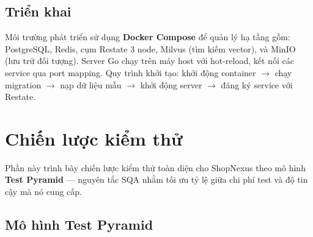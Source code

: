 \subsection{Triển khai}
\label{subsec:deployment}

Môi trường phát triển sử dụng \textbf{Docker Compose} để quản lý hạ tầng gồm: PostgreSQL, Redis, cụm Restate 3 node, Milvus (tìm kiếm vector), và MinIO (lưu trữ đối tượng). Server Go chạy trên máy host với hot-reload, kết nối các service qua port mapping. Quy trình khởi tạo: khởi động container $\rightarrow$ chạy migration $\rightarrow$ nạp dữ liệu mẫu $\rightarrow$ khởi động server $\rightarrow$ đăng ký service với Restate.

\section{Chiến lược kiểm thử}
\label{sec:test-strategy}

Phần này trình bày chiến lược kiểm thử toàn diện cho ShopNexus theo mô hình \textbf{Test Pyramid} --- nguyên tắc SQA nhằm tối ưu tỷ lệ giữa chi phí test và độ tin cậy mà nó cung cấp.

\subsection{Mô hình Test Pyramid}
\label{subsec:test-pyramid}

\begin{center}
\label{fig:test-pyramid}
\end{center}

